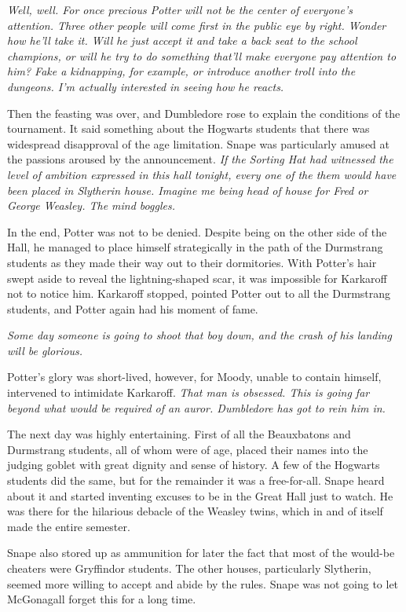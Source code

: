 \emph{Well, well. For once precious Potter will not be the center of everyone's attention. Three other people will come first in the public eye by right. Wonder how he'll take it. Will he just accept it and take a back seat to the school champions, or will he try to do something that'll make everyone pay attention to him? Fake a kidnapping, for example, or introduce another troll into the dungeons. I'm actually interested in seeing how he reacts.}

Then the feasting was over, and Dumbledore rose to explain the conditions of the tournament. It said something about the Hogwarts students that there was widespread disapproval of the age limitation. Snape was particularly amused at the passions aroused by the announcement. \emph{If the Sorting Hat had witnessed the level of ambition expressed in this hall tonight, every one of the them would have been placed in Slytherin house. Imagine me being head of house for Fred or George Weasley. The mind boggles.}

In the end, Potter was not to be denied. Despite being on the other side of the Hall, he managed to place himself strategically in the path of the Durmstrang students as they made their way out to their dormitories. With Potter's hair swept aside to reveal the lightning-shaped scar, it was impossible for Karkaroff not to notice him. Karkaroff stopped, pointed Potter out to all the Durmstrang students, and Potter again had his moment of fame.

\emph{Some day someone is going to shoot that boy down, and the crash of his landing will be glorious.}

Potter's glory was short-lived, however, for Moody, unable to contain himself, intervened to intimidate Karkaroff. \emph{That man is obsessed. This is going far beyond what would be required of an auror. Dumbledore has got to rein him in.}

The next day was highly entertaining. First of all the Beauxbatons and Durmstrang students, all of whom were of age, placed their names into the judging goblet with great dignity and sense of history. A few of the Hogwarts students did the same, but for the remainder it was a free-for-all. Snape heard about it and started inventing excuses to be in the Great Hall just to watch. He was there for the hilarious debacle of the Weasley twins, which in and of itself made the entire semester.

Snape also stored up as ammunition for later the fact that most of the would-be cheaters were Gryffindor students. The other houses, particularly Slytherin, seemed more willing to accept and abide by the rules. Snape was not going to let McGonagall forget this for a long time.

